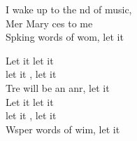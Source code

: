 \begin{cancion}
	I wake up to the nd of music, \\
	Mer Mary ces to me\\
	Spking words of wom, let it  \jump\\
	\begin{chorus}%
		Let it  let it \\
		let it , let it \\
		Tre will be an anr, let it \\
	\jump
		Let it  let it \\
		let it , let it \\
		Wsper words of wim, let it \jump\\
	\end{chorus}%
\end{cancion}%
